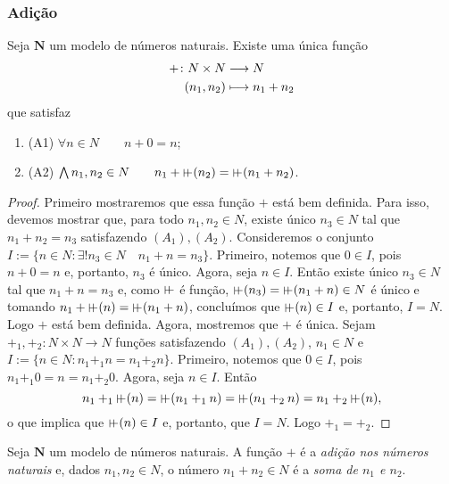 \subsubsection{Adição}

\begin{theorem}
	Seja $\bm N$ um modelo de números naturais. Existe uma única função
	\begin{align*}
	{+}\colon {N \times N} &\longrightarrow {N} \\{(n_1,n_2)} &\longmapsto n_1+n_2
	\end{align*}
que satisfaz
	\begin{enumerate}
	\item (A1) $\forall n \in N \qquad n + 0 = n$;
	\item (A2) $\forall n_1,n_2 \in N \qquad n_1 + \suce(n_2) = \suce(n_1+n_2)$.
	\end{enumerate}
\end{theorem}
\begin{proof}
	Primeiro mostraremos que essa função $+$ está bem definida. Para isso, devemos mostrar que, para todo $n_1,n_2 \in N$, existe único $n_3 \in N$ tal que $n_1+n_2=n_3$ satisfazendo $(A_1),(A_2)$. Consideremos o conjunto $I := \{n \in N : \exists! n_3 \in N \quad n_1+n=n_3\}$. Primeiro, notemos que $0 \in I$, pois $n+0=n$ e, portanto, $n_3$ é único. Agora, seja $n \in I$. Então existe único $n_3 \in N$ tal que $n_1+n=n_3$ e, como $\suce$ é função, $\suce(n_3)=\suce(n_1+n) \in N$ é único e tomando $n_1+\suce(n)=\suce(n_1+n)$, concluímos que $\suce(n) \in I$ e, portanto, $I=N$. Logo $+$ está bem definida. Agora, mostremos que $+$ é única. Sejam $+_1,+_2:N \times N \to N$ funções satisfazendo $(A_1),(A_2)$, $n_1 \in N$ e $I := \{n \in N : n_1 +_1 n = n_1 +_2 n \}$. Primeiro, notemos que $0 \in I$, pois $n_1 +_1 0 =n = n_1 +_2 0$. Agora, seja $n \in I$. Então
	\begin{equation*}
	n_1 +_1 \suce(n) = \suce(n_1 +_1 n) = \suce(n_1 +_2 n) = n_1 +_2 \suce(n),
	\end{equation*}
o que implica que $\suce(n) \in I$ e, portanto, que $I=N$. Logo $+_1 = +_2$.
\end{proof}

\begin{definition}
	Seja $\bm N$ um modelo de números naturais. A função $+$ é a \emph{adição nos números naturais} e, dados $n_1,n_2 \in N$, o número $n_1 + n_2 \in N$ é a \emph{soma de $n_1$ e $n_2$}.
\end{definition}


